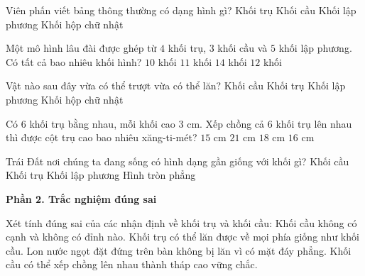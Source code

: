 \begin{ex} %
Viên phấn viết bảng thông thường có dạng hình gì?
\choice
{\True Khối trụ}
{Khối cầu}
{Khối lập phương}
{Khối hộp chữ nhật}
\end{ex}

\begin{ex} %
Một mô hình lâu đài được ghép từ $4$ khối trụ, $3$ khối cầu và $5$ khối lập phương. Có tất cả bao nhiêu khối hình?
\choice
{$10$ khối}
{$11$ khối}
{$14$ khối}
{\True $12$ khối}
\end{ex}

\begin{ex} %
Vật nào sau đây vừa có thể trượt vừa có thể lăn?
\choice
{Khối cầu}
{\True Khối trụ}
{Khối lập phương}
{Khối hộp chữ nhật}
\end{ex}

\begin{ex} %
Có $6$ khối trụ bằng nhau, mỗi khối cao $3\text{ cm}$. Xếp chồng cả $6$ khối trụ lên nhau thì được cột trụ cao bao nhiêu xăng-ti-mét?
\choice
{$15\text{ cm}$}
{$21\text{ cm}$}
{\True $18\text{ cm}$}
{$16\text{ cm}$}
\end{ex}

\begin{ex} %
Trái Đất nơi chúng ta đang sống có hình dạng gần giống với khối gì?
\choice
{\True Khối cầu}
{Khối trụ}
{Khối lập phương}
{Hình tròn phẳng}
\end{ex}

\textbf{Phần 2. Trắc nghiệm đúng sai}

\begin{ex} %
Xét tính đúng sai của các nhận định về khối trụ và khối cầu:
\choiceTF
{\True Khối cầu không có cạnh và không có đỉnh nào.}
{Khối trụ có thể lăn được về mọi phía giống như khối cầu.}
{\True Lon nước ngọt đặt đứng trên bàn không bị lăn vì có mặt đáy phẳng.}
{Khối cầu có thể xếp chồng lên nhau thành tháp cao vững chắc.}
\end{ex}

